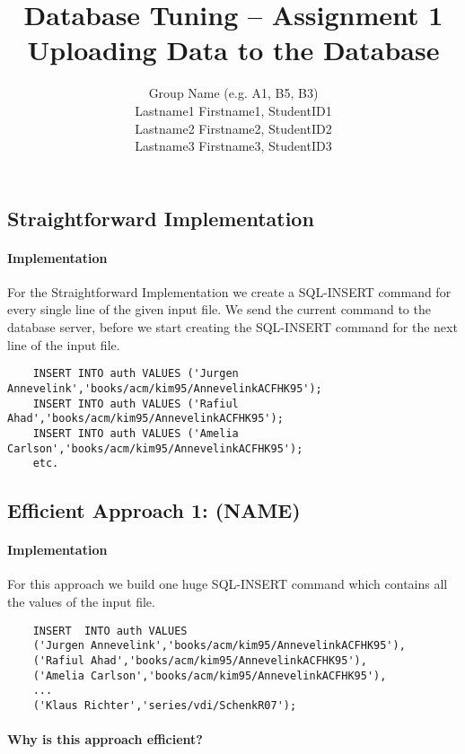 \documentclass[11pt]{scrartcl}
\title{
  \textbf{\large Database Tuning -- Assignment 1}\\
  Uploading Data to the Database
}
\author{
 Group Name (e.g. A1, B5, B3)\\
 \large Lastname1 Firstname1, StudentID1 \\
 \large Lastname2 Firstname2, StudentID2 \\
 \large Lastname3 Firstname3, StudentID3
}
\begin{document}
\maketitle

\subsection*{Straightforward Implementation}

  \paragraph{Implementation}

  For the Straightforward Implementation we create a SQL-INSERT command for every single line of the given input file. We send the current command to the database server, before we start creating the SQL-INSERT command for the next line of the input file.

{\small
\begin{verbatim}
    INSERT INTO auth VALUES ('Jurgen Annevelink','books/acm/kim95/AnnevelinkACFHK95');
    INSERT INTO auth VALUES ('Rafiul Ahad','books/acm/kim95/AnnevelinkACFHK95');
    INSERT INTO auth VALUES ('Amelia Carlson','books/acm/kim95/AnnevelinkACFHK95');
    etc.
\end{verbatim}
}

  \subsection*{Efficient Approach 1: (NAME)}

  \paragraph{Implementation}

  For this approach we build one huge SQL-INSERT command which contains all the values of the input file.

{\small
\begin{verbatim}
    INSERT  INTO auth VALUES
    ('Jurgen Annevelink','books/acm/kim95/AnnevelinkACFHK95'),
    ('Rafiul Ahad','books/acm/kim95/AnnevelinkACFHK95'),
    ('Amelia Carlson','books/acm/kim95/AnnevelinkACFHK95'),
    ...
    ('Klaus Richter','series/vdi/SchenkR07');
\end{verbatim}
}

  \paragraph{Why is this approach efficient?}
\end{document}
